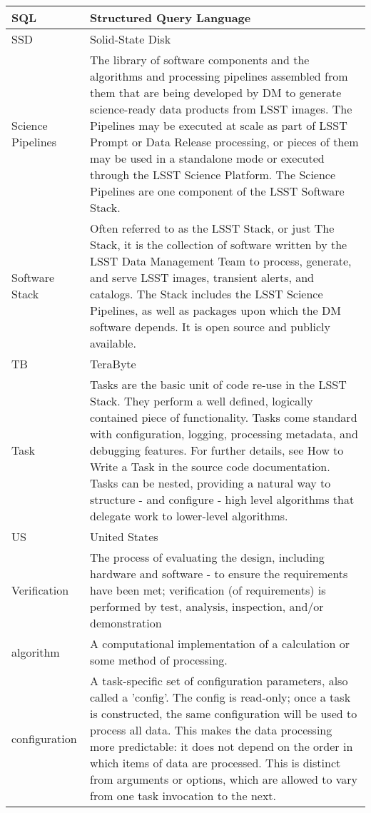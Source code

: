 \begin{longtable}{|p{}|p{}|}
SQL & Structured Query Language \\\hline
SSD & Solid-State Disk \\\hline
Science Pipelines & The library of software components and the algorithms and processing pipelines assembled from them that are being developed by DM to generate science-ready data products from LSST images. The Pipelines may be executed at scale as part of LSST Prompt or Data Release processing, or pieces of them may be used in a standalone mode or executed through the LSST Science Platform. The Science Pipelines are one component of the LSST Software Stack. \\\hline
Software Stack & Often referred to as the LSST Stack, or just The Stack, it is the collection of software written by the LSST Data Management Team to process, generate, and serve LSST images, transient alerts, and catalogs. The Stack includes the LSST Science Pipelines, as well as packages upon which the DM software depends. It is open source and publicly available. \\\hline
TB & TeraByte \\\hline
Task & Tasks are the basic unit of code re-use in the LSST Stack. They perform a well defined, logically contained piece of functionality. Tasks come standard with configuration, logging, processing metadata, and debugging features. For further details, see How to Write a Task in the source code documentation.  Tasks can be nested, providing a natural way to structure - and configure - high level algorithms that delegate work to lower-level algorithms. \\\hline
US & United States \\\hline
Verification & The process of evaluating the design, including hardware and software - to ensure the requirements have been met;  verification (of requirements) is performed by test, analysis, inspection, and/or demonstration \\\hline
algorithm & A computational implementation of a calculation or some method of processing. \\\hline
configuration & A task-specific set of configuration parameters, also called a 'config'. The config is read-only; once a task is constructed, the same configuration will be used to process all data. This makes the data processing more predictable: it does not depend on the order in which items of data are processed. This is distinct from arguments or options, which are allowed to vary from one task invocation to the next. \\\hline

\end{longtable}
